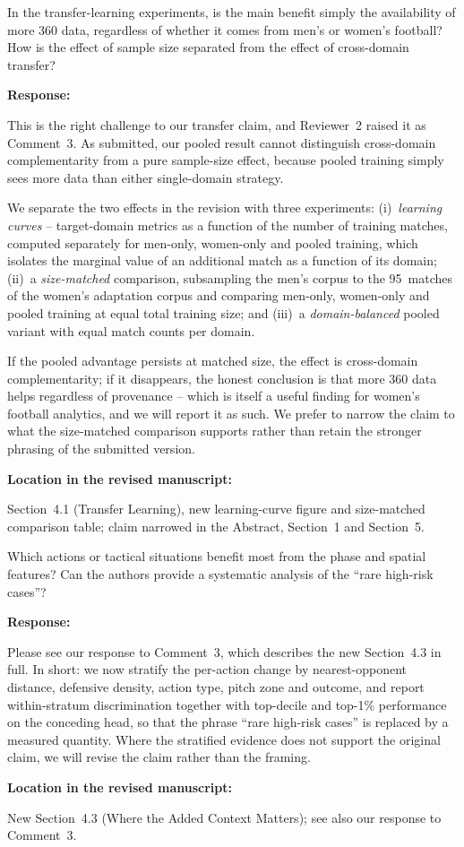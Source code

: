 \documentclass[11pt,a4paper]{article}
\newcommand{\pending}[1]{\textcolor{statuspending}{#1}}
\newcommand{\newwork}[1]{\textcolor{statusnew}{#1}}
\newcommand{\response}[2]{%
  \begin{responsebox}
  \textbf{Response:}

  #1
  \end{responsebox}
  \begin{locationbox}
  \textbf{Location in the revised manuscript:}

  #2
  \end{locationbox}
}
\begin{document}
\begin{reviewbox}[Question 2]
In the transfer-learning experiments, is the main benefit simply the availability of more 360 data, regardless of whether it comes from men's or women's football? How is the effect of sample size separated from the effect of cross-domain transfer?
\end{reviewbox}
\response{This is the right challenge to our transfer claim, and Reviewer~2 raised it as Comment~3. As submitted, our pooled result cannot distinguish cross-domain complementarity from a pure sample-size effect, because pooled training simply sees more data than either single-domain strategy.

\pending{We separate the two effects in the revision with three experiments: (i)~\emph{learning curves} -- target-domain metrics as a function of the number of training matches, computed separately for men-only, women-only and pooled training, which isolates the marginal value of an additional match as a function of its domain; (ii)~a \emph{size-matched} comparison, subsampling the men's corpus to the 95~matches of the women's adaptation corpus and comparing men-only, women-only and pooled training at equal total training size; and (iii)~a \emph{domain-balanced} pooled variant with equal match counts per domain.}

\pending{If the pooled advantage persists at matched size, the effect is cross-domain complementarity; if it disappears, the honest conclusion is that more 360 data helps regardless of provenance -- which is itself a useful finding for women's football analytics, and we will report it as such. We prefer to narrow the claim to what the size-matched comparison supports rather than retain the stronger phrasing of the submitted version.}}{Section~4.1 (Transfer Learning), new learning-curve figure and size-matched comparison table; claim narrowed in the Abstract, Section~1 and Section~5.}

\begin{reviewbox}[Question 3]
Which actions or tactical situations benefit most from the phase and spatial features? Can the authors provide a systematic analysis of the ``rare high-risk cases''?
\end{reviewbox}
\response{\newwork{Please see our response to Comment~3, which describes the new Section~4.3 in full. In short: we now stratify the per-action change by nearest-opponent distance, defensive density, action type, pitch zone and outcome, and report within-stratum discrimination together with top-decile and top-1\% performance on the conceding head, so that the phrase ``rare high-risk cases'' is replaced by a measured quantity. Where the stratified evidence does not support the original claim, we will revise the claim rather than the framing.}}{New Section~4.3 (Where the Added Context Matters); see also our response to Comment~3.}
\end{document}
